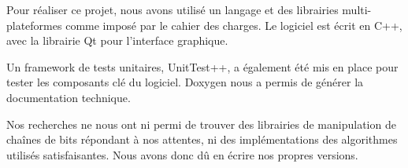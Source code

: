 Pour réaliser ce projet, nous avons utilisé un langage et des librairies multi-plateformes comme imposé par le cahier des charges. Le logiciel est écrit en C++, avec la librairie Qt pour l'interface graphique.

Un framework de tests unitaires, UnitTest++, a également été mis en place pour tester les composants clé du logiciel. Doxygen nous a permis de générer la documentation technique.

Nos recherches ne nous ont ni permi de trouver des librairies de manipulation de chaînes de bits répondant à nos attentes, ni des implémentations des algorithmes utilisés satisfaisantes. Nous avons donc dû en écrire nos propres versions.
